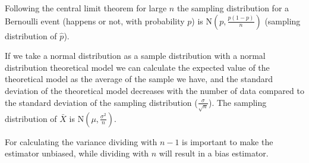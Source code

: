  Following the central limit theorem for large $n$ the sampling distribution for
 a Bernoulli event (happens or not, with probability $p$) is N$\left( p,
 \frac{p(1-p)}{n}\right)$ (sampling distribution of $\hat{p}$).
 
 If we take a normal distribution as a sample distribution with a normal
 distribution theoretical model we can calculate the expected value of the
 theoretical model as the average of the sample we have, and the standard
 deviation of the theoretical model decreases with the number of data compared
 to the standard deviation of the sampling distribution
 ($\frac{\sigma}{\sqrt{n}}$). The sampling distribution of $\bar{X}$ is N$\left(
 \mu, \frac{\sigma^2}{n}\right)$.
 
 For calculating the variance dividing with $n-1$ is important to make the
 estimator unbiased, while dividing with $n$ will result in a bias estimator.
 
